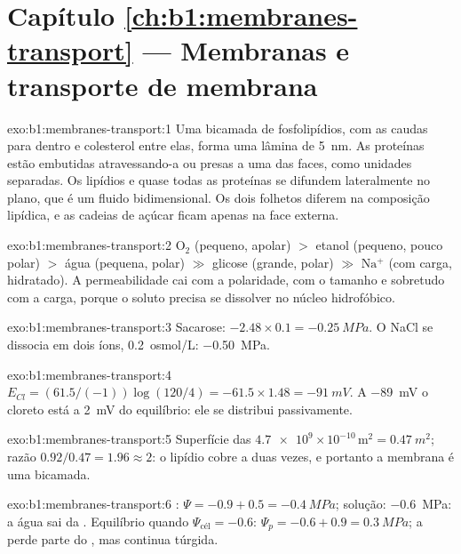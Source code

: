 \section*{Capítulo \ref{ch:b1:membranes-transport} --- Membranas e transporte de membrana}

\begin{solution}{exo:b1:membranes-transport:1}
Uma bicamada de fosfolipídios, com as caudas para dentro e colesterol
entre elas, forma uma lâmina de \qty{5}{nm}. As proteínas estão
embutidas atravessando-a ou presas a uma das faces, como unidades
separadas. Os lipídios e quase todas as proteínas se difundem
lateralmente no plano, que é um fluido bidimensional. Os dois folhetos
diferem na composição lipídica, e as cadeias de açúcar ficam apenas na
face externa.
\end{solution}

\begin{solution}{exo:b1:membranes-transport:2}
$\mathrm{O_2}$ (pequeno, apolar) $>$ etanol (pequeno, pouco polar) $>$
água (pequena, polar) $\gg$ glicose (grande, polar) $\gg$
$\mathrm{Na^+}$ (com carga, hidratado). A permeabilidade cai com a
polaridade, com o tamanho e sobretudo com a carga, porque o soluto
precisa se dissolver no núcleo hidrofóbico.
\end{solution}

\begin{solution}{exo:b1:membranes-transport:3}
Sacarose: $-2.48\times 0.1 = \qty{-0.25}{MPa}$. O NaCl se dissocia em
dois íons, \qty{0.2}{osmol/L}: \qty{-0.50}{MPa}.
\end{solution}

\begin{solution}{exo:b1:membranes-transport:4}
$E_{Cl} = (61.5/(-1))\log(120/4) = -61.5\times 1.48 = \qty{-91}{mV}$. A
\qty{-89}{mV} o cloreto está a \qty{2}{mV} do equilíbrio: ele se
distribui passivamente.
\end{solution}

\begin{solution}{exo:b1:membranes-transport:5}
Superfície das  $\num{4.7e9}\times 10^{-10}\,\mathrm{m^2} =
\qty{0.47}{m^2}$; razão $0.92/0.47 = 1.96 \approx 2$: o lipídio cobre a
 duas vezes, e portanto a membrana é uma bicamada.
\end{solution}

\begin{solution}{exo:b1:membranes-transport:6}
: $\Psi = -0.9 + 0.5 = \qty{-0.4}{MPa}$; solução:
\qty{-0.6}{MPa}: a água sai da . Equilíbrio quando
$\Psi_{\text{cél}} = -0.6$: $\Psi_p = -0.6 + 0.9 = \qty{0.3}{MPa}$; a
 perde parte do , mas continua túrgida.
\end{solution}


